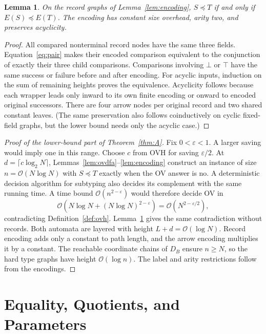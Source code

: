 \documentclass[11pt,letterpaper]{article}
\newtheorem{lemma}[theorem]{Lemma}
\theoremstyle{definition}\newtheorem{definition}[theorem]{Definition}
\newcommand{\Sub}{\ensuremath{\preceq}}
\newcommand{\Oh}{\mathcal O}
\begin{document}
\begin{lemma}\label{lem:arrows}
On the record graphs of Lemma~\ref{lem:encoding}, $S\Sub T$ if and only if $E(S)\Sub E(T)$. The encoding has constant size overhead, arity two, and preserves acyclicity.
\end{lemma}
\begin{proof}
All compared nonterminal record nodes have the same three fields. Equation~\eqref{eq:pair} makes their encoded comparison equivalent to the conjunction of exactly their three child comparisons. Comparisons involving $\bot$ or $\top$ have the same success or failure before and after encoding. For acyclic inputs, induction on the sum of remaining heights proves the equivalence. Acyclicity follows because each wrapper leads only inward to its own finite encoding or onward to encoded original successors. There are four arrow nodes per original record and two shared constant leaves. (The same preservation also follows coinductively on cyclic fixed-field graphs, but the lower bound needs only the acyclic case.)
\end{proof}

\begin{proof}[Proof of the lower-bound part of Theorem~\ref{thm:A}]
Fix $0<\varepsilon<1$. A larger saving would imply one in this range. Choose $c$ from OVH for saving $\varepsilon/2$. At $d=\lceil c\log_2N\rceil$, Lemmas~\ref{lem:ovdfa}--\ref{lem:encoding} construct an instance of size $n=\Oh(N\log N)$ with $S\Sub T$ exactly when the OV answer is no. A deterministic decision algorithm for subtyping also decides its complement with the same running time. A time bound $\Oh(n^{2-\varepsilon})$ would therefore decide OV in
\[
 \Oh(N\log N+(N\log N)^{2-\varepsilon})
 =\Oh(N^{2-\varepsilon/2}),
\]
contradicting Definition~\ref{def:ovh}. Lemma~\ref{lem:arrows} gives the same contradiction without records. Both automata are layered with height $L+d=\Oh(\log N)$. Record encoding adds only a constant to path length, and the arrow encoding multiplies it by a constant. The reachable coordinate chains of $D_B$ ensure $n\ge N$, so the hard type graphs have height $\Oh(\log n)$. The label and arity restrictions follow from the encodings.
\end{proof}


\section{Equality, Quotients, and Parameters}\label{sec:upper}
\end{document}
